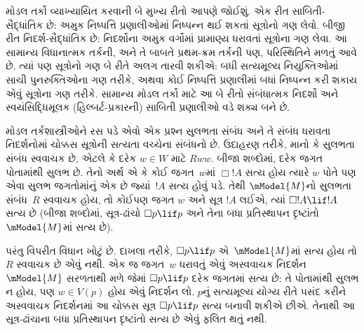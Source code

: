મોડલ તર્કો વ્યાખ્યાયિત કરવાની
બે મુખ્ય રીતો આપણે જોઈશું.
એક રીત સાબિતી-સૈદ્ધાંતિક
છે: અમુક નિષ્પત્તિ
પ્રણાલીઓમાં નિષ્પન્ન થઈ
શકતાં સૂત્રોનો ગણ
લેવો. બીજી રીત
નિદર્શ-સૈદ્ધાંતિક છે:
નિદર્શોના અમુક વર્ગોમાં
પ્રામાણ્ય ધરાવતાં
સૂત્રોના ગણ લેવા.
આ સામાન્ય વિધાનાત્મક
તર્કની, અને તે બાબતે
પ્રથમ-ક્રમ તર્કની પણ,
પરિસ્થિતિને મળતું આવે
છે. ત્યાં પણ
સૂત્રોનો ગણ
બે રીતે અલગ તારવી
શકીએ: બધી સત્યમૂલ્ય
નિયુક્તિઓમાં સાચી
પુનરુક્તિઓના ગણ તરીકે,
અથવા કોઈ નિષ્પત્તિ
પ્રણાલીમાં બધાં
નિષ્પન્ન કરી શકાય એવું
સૂત્રોના ગણ
તરીકે. સામાન્ય
મોડલ તર્કો માટે
આ બે રીતો
સંબંધાત્મક નિદર્શો
અને સ્વયંસિદ્ધિમૂલક
(હિલ્બર્ટ-પ્રકારની)
સાબિતી પ્રણાલીઓ
વડે શક્ય બને છે.
\endgroup
\endgroup


\begingroup
\makeatletter{}\makeatother

\label{guunit:OLP-0419}


\begingroup
\makeatletter{}\makeatother


\label{guunit:OLP-0420}


મોડલ તર્કશાસ્ત્રીઓને રસ પડે એવો એક પ્રશ્ન સુલભતા
સંબંધ અને તે સંબંધ ધરાવતા નિદર્શનોમાં ચોક્કસ
સૂત્રોની સત્યતા વચ્ચેના સંબંધનો છે. ઉદાહરણ
તરીકે, માનો કે સુલભતા સંબંધ સ્વવાચક છે, એટલે કે
દરેક $w
\in W$ માટે $Rww$. બીજા શબ્દોમાં, દરેક જગત
પોતામાંથી સુલભ છે. તેનો અર્થ એ કે કોઈ જગત~$w$માં
$\Box !A$ સત્ય હોય ત્યારે $w$ પોતે પણ એવા સુલભ
જગતોમાંનું એક છે જ્યાં~$!A$ સત્ય હોવું પડે. તેથી
$\mModel{M}$નો સુલભતા સંબંધ~$R$ સ્વવાચક હોય, તો
કોઈપણ જગત $w$ અને સૂત્ર $!A$ લઈએ, ત્યાં $\Box !A
\lif !A$ સત્ય છે (બીજા શબ્દોમાં, સૂત્ર-ઢાંચો $\Box p \lif
p$ અને તેના બધા પ્રતિસ્થાપન દૃષ્ટાંતો~$\mModel{M}$માં
સત્ય છે).

પરંતુ વિપરીત વિધાન ખોટું છે. દાખલા તરીકે,
$\Box p \lif p$ એ~$\mModel{M}$માં સત્ય હોય તો $R$
સ્વવાચક છે એવું નથી. એક જ જગત~$w$ ધરાવતું એવું
અસ્વવાચક નિદર્શન~$\mModel{M}$ સરળતાથી મળે જેમાં
$\Box p \lif
p$ દરેક જગતમાં સત્ય છે: તે પોતામાંથી સુલભ
ન હોય, પણ $w \in V(p)$ હોય એવું નિદર્શન લો.
$p$નું સત્યમૂલ્ય યોગ્ય રીતે પસંદ કરીને અસ્વવાચક
નિદર્શનમાં આ ચોક્કસ સૂત્ર $\Box p \lif p$ સત્ય બનાવી શકીએ છીએ.
તેનાથી આ સૂત્ર-ઢાંચાના બધા પ્રતિસ્થાપન દૃષ્ટાંતો સત્ય છે
એવું ફલિત થતું નથી.

